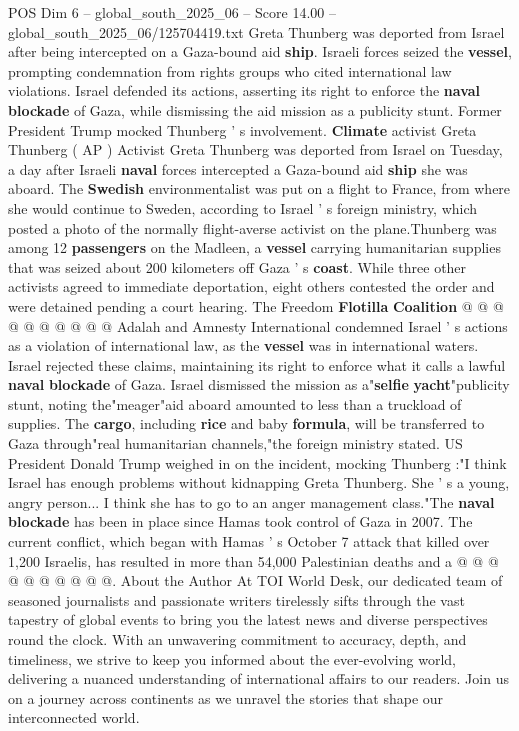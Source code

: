 \begin{textsample}{POS Dim 6 – global\_south\_2025\_06 – Score 14.00 – global\_south\_2025\_06/125704419.txt}  \label{ex:f6_pos_013}
Greta Thunberg was deported from Israel after being intercepted on a Gaza-bound aid \textbf{ship}.
Israeli forces seized the \textbf{vessel}, prompting condemnation from rights groups who cited international law violations.
Israel defended its actions, asserting its right to enforce the \textbf{naval} \textbf{blockade} of Gaza, while dismissing the aid mission as a publicity stunt.
Former President Trump mocked Thunberg ' s involvement. \textbf{Climate} activist Greta Thunberg ( AP ) Activist Greta Thunberg was deported from Israel on Tuesday, a day after Israeli \textbf{naval} forces intercepted a Gaza-bound aid \textbf{ship} she was aboard.
The \textbf{Swedish} environmentalist was put on a flight to France, from where she would continue to Sweden, according to Israel ' s foreign ministry, which posted a photo of the normally flight-averse activist on the plane.Thunberg was among 12 \textbf{passengers} on the Madleen, a \textbf{vessel} carrying humanitarian supplies that was seized about 200 kilometers off Gaza ' s \textbf{coast}.
While three other activists agreed to immediate deportation, eight others contested the order and were detained pending a court hearing.
The Freedom \textbf{Flotilla} \textbf{Coalition} @ @ @ @ @ @ @ @ @ @ Adalah and Amnesty International condemned Israel ' s actions as a violation of international law, as the \textbf{vessel} was in international waters.
Israel rejected these claims, maintaining its right to enforce what it calls a lawful \textbf{naval} \textbf{blockade} of Gaza.
Israel dismissed the mission as a"\textbf{selfie} \textbf{yacht}"publicity stunt, noting the"meager"aid aboard amounted to less than a truckload of supplies.
The \textbf{cargo}, including \textbf{rice} and baby \textbf{formula}, will be transferred to Gaza through"real humanitarian channels,"the foreign ministry stated.
US President Donald Trump weighed in on the incident, mocking Thunberg :"I think Israel has enough problems without kidnapping Greta Thunberg.
She ' s a young, angry person...
I think she has to go to an anger management class."The \textbf{naval} \textbf{blockade} has been in place since Hamas took control of Gaza in 2007.
The current conflict, which began with Hamas ' s October 7 attack that killed over 1,200 Israelis, has resulted in more than 54,000 Palestinian deaths and a @ @ @ @ @ @ @ @ @ @.
About the Author At TOI World Desk, our dedicated team of seasoned journalists and passionate writers tirelessly sifts through the vast tapestry of global events to bring you the latest news and diverse perspectives round the clock.
With an unwavering commitment to accuracy, depth, and timeliness, we strive to keep you informed about the ever-evolving world, delivering a nuanced understanding of international affairs to our readers.
Join us on a journey across continents as we unravel the stories that shape our interconnected world.

\end{textsample}
